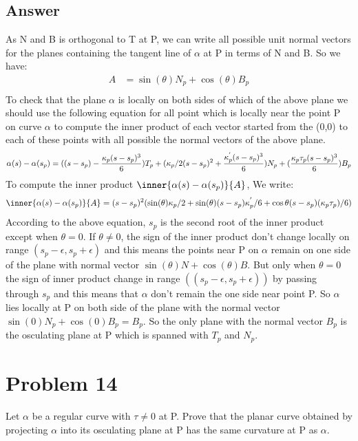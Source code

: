 \documentclass[
	12pt, %
]{fphw}
\theoremstyle{plain}
\begin{document}
\subsection*{Answer}
\setcounter{assumption}{0}
\setcounter{equation}{0}
As N and B is orthogonal to T at P, we can write all possible unit normal vectors for the planes containing the tangent line of $\alpha$ at P 
in terms of N and B. So we have:
\begin{align}
     A & = \sin(\theta)N_{p}+\cos(\theta)B_{p} \\ 
\end{align}
To check that the plane $\alpha$ is locally on both sides of which of the above plane we should use the following equation for all point which is locally near the point P on curve $\alpha$ to compute
the inner product of each vector started from the (0,0) to each of these points with all possible the normal vectors of the above plane.
\begin{equation}
     \alpha(s)-\alpha(s_{p}) = ((s-s_{p})-\frac{\kappa_{p}(s-s_p)^{3}}{6}) T_p + (\kappa_{p}/2(s-s_{p})^{2}+\frac{\kappa^{'}_{p}(s-s_p)^{3}}{6}) N_p + (\frac{\kappa_{p}\tau_{p}(s-s_p)^{3}}{6}) B_p\\ 
\end{equation}
To compute the inner product $\inner{\alpha(s)-\alpha(s_{p})}{A}$, We write:
\begin{equation}
     \inner{\alpha(s)-\alpha(s_{p})}{A} = (s-s_p)^{2}(\sin(\theta) \kappa_{p}/2  + \sin(\theta)(s-s_{p})\kappa^{'}_{p}/6  + \cos\theta (s-s_{p})(\kappa_{p}\tau_p)/6) 
\end{equation}
According to the above equation, $s_{p}$ is the second root of the inner product  except when $\theta=0$. If $\theta\neq0$, the sign of the inner product don't change locally on range $(s_{p}-\epsilon,s_{p}+\epsilon)$
and this means the points near P on $\alpha$ remain on one side of the plane with normal vector $\sin(\theta)N+\cos(\theta)B$. But only when $\theta=0$ the sign of inner product change in range $((s_{p}-\epsilon,s_{p}+\epsilon))$ by passing through $s_p$ and this means that $\alpha$
don't remain the one side near point P. So $\alpha$ lies locally at P on both side of the plane with the normal vector $\sin(0)N_{p}+\cos(0)B_{p}=B_{p}$. So the only plane with the normal vector $B_p$ is the osculating plane at P which is spanned with $T_{p}$ and $N_{p}$.

\section*{Problem 14}
\begin{problem}
     Let $\alpha$ be a regular curve with $\tau \neq 0$ at P. Prove that the planar curve obtained by projecting $\alpha$ into its
osculating plane at P has the same curvature at P as $\alpha$.
\end{problem}
\end{document}
